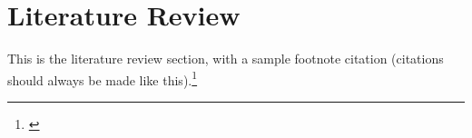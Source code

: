 \documentclass[../main.tex]{subfiles}
\begin{document}
    
\chapter{Literature Review}
    
This is the literature review section, with a sample footnote citation (citations should always be made like this).\footnote{\cite{UniversityofPennsylvania-WRDSWhartonResearchDataServices2019CompustatIQ}}
\end{document}
